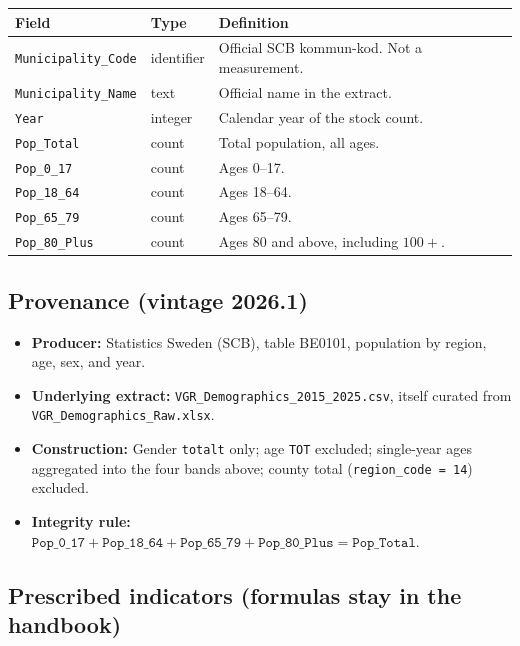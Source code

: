 \documentclass[11pt,a4paper]{article}
\begin{document}
\begin{center}
\small
\begin{tabularx}{\textwidth}{@{}p{}p{}X@{}}
\toprule
Field & Type & Definition \\
\midrule
\texttt{Municipality\_Code} & identifier & Official SCB kommun-kod. Not a measurement. \\
\texttt{Municipality\_Name} & text & Official name in the extract. \\
\texttt{Year} & integer & Calendar year of the stock count. \\
\texttt{Pop\_Total} & count & Total population, all ages. \\
\texttt{Pop\_0\_17} & count & Ages 0--17. \\
\texttt{Pop\_18\_64} & count & Ages 18--64. \\
\texttt{Pop\_65\_79} & count & Ages 65--79. \\
\texttt{Pop\_80\_Plus} & count & Ages 80 and above, including $100+$. \\
\bottomrule
\end{tabularx}
\end{center}

\subsection*{Provenance (vintage 2026.1)}

\begin{itemize}
    \item \textbf{Producer:} Statistics Sweden (SCB), table BE0101,
    population by region, age, sex, and year.
    \item \textbf{Underlying extract:}
    \texttt{VGR\_Demographics\_2015\_2025.csv}, itself curated from
    \texttt{VGR\_Demographics\_Raw.xlsx}.
    \item \textbf{Construction:} Gender \texttt{totalt} only; age
    \texttt{TOT} excluded; single-year ages aggregated into the four
    bands above; county total (\texttt{region\_code = 14}) excluded.
    \item \textbf{Integrity rule:}
    $\texttt{Pop\_0\_17}+\texttt{Pop\_18\_64}+\texttt{Pop\_65\_79}+\texttt{Pop\_80\_Plus}=\texttt{Pop\_Total}$.
\end{itemize}

\subsection*{Prescribed indicators (formulas stay in the handbook)}
\end{document}
